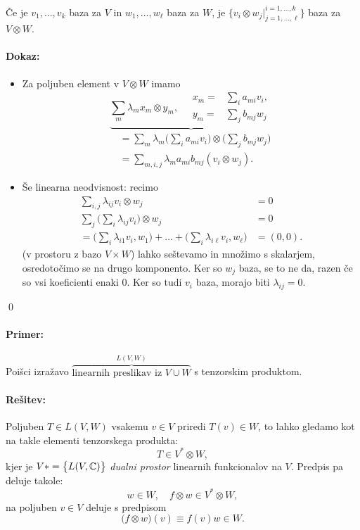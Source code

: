 \begin{trditev}
	\v Ce je $v_1, \ldots, v_k$ baza za $V$ in $w_1, \ldots, w_\ell$ baza za $W$, je $\big\{v_i \otimes w_j |^{i = 1, \ldots, k}_{j
		= 1, \ldots, \ell}\big\}$ baza za $V \otimes W$.
\end{trditev}

\paragraph{Dokaz:}
\begin{itemize}
	\item{Za poljuben element v $V \otimes W$ imamo
		\[
			\underbrace{\sum_m \lambda_m x_m \otimes y_m, \quad \begin{array}{rl}
				x_m =& \sum_i a_{mi} v_i, \\
				y_m =& \sum_j b_{mj} w_j
			\end{array}}_{}
		\]\vspace{-5ex}
		\begin{align*}
			&= \sum_m \lambda_m \Big(\sum_i a_{mi} v_i\Big) \otimes \Big(\sum_j b_{mj} w_j\Big) \\
			&= \sum_{m,i,j} \lambda_m a_{mi} b_{mj} (v_i \otimes w_j).
		\end{align*}}
	\item{\v Se linearna neodvisnost: recimo 
		\begin{align*}
			\sum_{i,j} \lambda_{ij} v_i \otimes w_j &= 0 \\
			\sum_j \Big(\sum_i \lambda_{ij} v_i\Big) \otimes w_j &= 0 \\
			= \Big(\sum_i \lambda_{i1} v_i, w_1\Big) + \ldots + \Big(\sum_i \lambda_{i\ell} v_i, w_\ell\Big) &= (0, 0).
		\end{align*}
		(v prostoru z bazo $V \times W$) lahko se\v stevamo in mno\v zimo s skalarjem, osredoto\v cimo se na drugo komponento.
		Ker so $w_j$ baza, se to ne da, razen \v ce so vsi koeficienti enaki 0. Ker so tudi $v_i$ baza, morajo biti 
		$\lambda_{ij} = 0$.}
\end{itemize}
\qed

\paragraph{Primer:}
Poi\v sci izra\v zavo $\overbrace{\text{linearnih preslikav iz $V \cup W$}}^{L (V, W)}$ s tenzorskim produktom.

\paragraph{Re\v sitev:}
Poljuben $T \in L(V, W)$ vsakemu $v \in V$ priredi $T(v) \in W$, to lahko gledamo kot na takle elementi tenzorskega
produkta:
\[
	T \in V^* \otimes W,
\]
kjer je $V* = \big\{L(V, \mathbb{C})\big\}$ {\em dualni prostor} linearnih funkcionalov na $V$. Predpis pa deluje takole:
\[
	w \in W, \quad f \otimes w \in V^* \otimes W,
\]
na poljuben $v \in V$ deluje s predpisom
\[
	\big(f\otimes w\big) (v) \equiv f(v) w \in W.
\]

